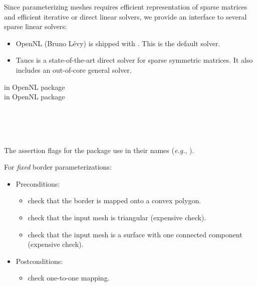 
Since parameterizing meshes requires
efficient representation of sparse matrices and efficient iterative or
direct linear solvers, we provide an interface to several
sparse linear solvers:
\begin{itemize}
\item
    OpenNL (Bruno L{\'e}vy) is shipped with \cgal. This is the default solver.
\item
    {\sc Taucs} is a state-of-the-art direct solver for sparse symmetric matrices.
    It also includes an out-of-core general solver.
\end{itemize}

 in OpenNL package  \\
 in OpenNL package  \\
  \\
  \\



  \\



The assertion flags for the package
use  in their names (\textit{e.g.},
).

For \emph{fixed} border parameterizations:
\begin{itemize}
\item Preconditions:
    \begin{itemize}
    \item check that the border is mapped onto a convex polygon.
    \item check that the input mesh is triangular (expensive check).
    \item check that the input mesh is a surface with one connected component (expensive check).
    \end{itemize}
\item Postconditions:
    \begin{itemize}
    \item check one-to-one mapping.
    \end{itemize}
\end{itemize}

